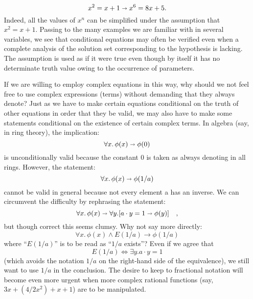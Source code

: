 $$
x^2 = x + 1 \shortrightarrow x^6 = 8x + 5.
$$
Indeed, all the values of $x^n$ can be simplified under the assumption that $x^2 =
x + 1$. Passing to the many examples we are familiar with in several variables,
we see that conditional equations may often be verified even when a complete analysis
of the solution set corresponding to the hypothesis is lacking. The assumption
is used as if it were true even though by itself it has no determinate truth value 
owing to the occurrence of parameters.

If we are willing to employ complex equations in this way, why should we not feel 
free to use complex expressions (terms) without demanding that they always denote? Just as we have to make certain equations conditional on the truth of
other equations in order that they be valid, we may also have to make some 
statements conditional on the existence of certain complex terms. In algebra (say, in ring theory), the implication:
$$
\forall x.\, \phi(x) \shortrightarrow \phi(0)
$$
is unconditionally valid because the constant 0 is taken as always denoting in
all rings. However, the statement:
$$
\forall x.\, \phi(x) \shortrightarrow \phi(1/a)
$$
cannot be valid in general because not every element a has an inverse. We can circumvent the difficulty by rephrasing the statement:
$$
\forall x.\, \phi(x) \shortrightarrow \forall y. [ a \cdot y = 1 \shortrightarrow \phi(y) ] \quad,
$$
but though correct this seems clumsy. Why not say more directly:
$$
\forall x.\, \phi(x) \land E(1/a) \to \phi(1/a)
$$
where ``$E(1/a)$'' is to be read as ``$1/a$ exists''? Even if we agree that
$$
E(1/a) \iff \exists y. a \cdot y = 1
$$
(which avoids the notation $1/a$ on the right-hand side of the equivalence), we still want to use $1/a$ in the conclusion. 
The desire to keep to fractional notation will become even more urgent when more complex rational functions 
(say, $3x + (4 / 2x^2) + x + 1$) are to be manipulated.
\begin{thebibliography}{86}


\end{thebibliography}
